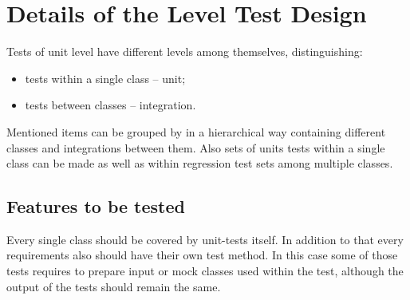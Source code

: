 \chapter{Details of the Level Test Design} \label{chp:details-of-the-level-test-design}
	\begin{comment}
		Introduce the following subordinate sections. This section describes the features to be tested and any
		refinements to the test approach as required for the level. It also identifies the sets of test cases (highest
		level test cases) or scenarios along with the pass/fail criteria. It may also include the test deliverables.
	\end{comment}
	Tests of unit level have different levels among themselves, distinguishing:
	\begin{itemize}
		\item tests within a single class -- unit;
		\item tests between classes -- integration.
	\end{itemize} 
	Mentioned items can be grouped by in a hierarchical way containing different classes and integrations between them. Also sets of units tests within a single class can be made as well as within regression test sets among multiple classes.
\section{Features to be tested} \label{s:details-of-the-level-test-design:features-to-be-tested}
	\begin{comment}
		Identify the test items and describe the features and combinations of features that are the object of this
		LTD. Other features that may be exercised but that are not the specific object of this LTD need not be
		identified (e.g., a database management system that is supporting the reports that are being tested). The
		LTD provides more detailed information than the Level Test Plan. For example, identify an overall test
		architecture of all test scenarios, the individual scenarios, and the detailed test objectives within each
		scenario.
		For each feature or feature combination, a reference to its associated requirements in the item
		requirement and/or design description may be included. This may be documented in a Test
		Traceability Matrix (LTP Section 2.2).
	\end{comment}
	Every single class should be covered by unit-tests itself. In addition to that every requirements also should have their own test method. In this case some of those tests requires to prepare input or mock classes used within the test, although the output of the tests should remain the same.

